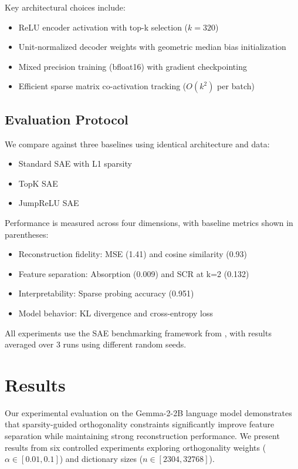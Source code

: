 \documentclass{article} %
\begin{document}
Key architectural choices include:
\begin{itemize}
    \item ReLU encoder activation with top-k selection ($k=320$)
    \item Unit-normalized decoder weights with geometric median bias initialization
    \item Mixed precision training (bfloat16) with gradient checkpointing
    \item Efficient sparse matrix co-activation tracking ($O(k^2)$ per batch)
\end{itemize}

\subsection{Evaluation Protocol}
We compare against three baselines using identical architecture and data:
\begin{itemize}
    \item Standard SAE with L1 sparsity \cite{gaoScalingEvaluatingSparse}
    \item TopK SAE \cite{bussmannBatchTopKSparseAutoencoders2024}
    \item JumpReLU SAE \cite{rajamanoharanJumpingAheadImproving2024}
\end{itemize}

Performance is measured across four dimensions, with baseline metrics shown in parentheses:
\begin{itemize}
    \item Reconstruction fidelity: MSE (1.41) and cosine similarity (0.93)
    \item Feature separation: Absorption (0.009) and SCR at k=2 (0.132)
    \item Interpretability: Sparse probing accuracy (0.951)
    \item Model behavior: KL divergence and cross-entropy loss
\end{itemize}

All experiments use the SAE benchmarking framework from \cite{karvonenEvaluatingSparseAutoencoders2024}, with results averaged over 3 runs using different random seeds.

\section{Results}
\label{sec:results}

Our experimental evaluation on the Gemma-2-2B language model demonstrates that sparsity-guided orthogonality constraints significantly improve feature separation while maintaining strong reconstruction performance. We present results from six controlled experiments exploring orthogonality weights ($\alpha \in [0.01, 0.1]$) and dictionary sizes ($n \in [2304, 32768]$).
\end{document}
